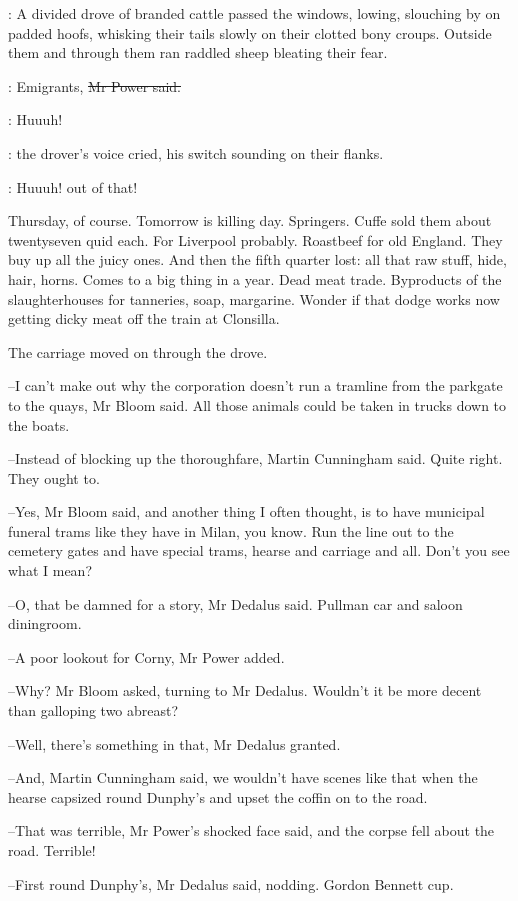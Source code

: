 :
A divided drove of branded cattle passed the windows,
lowing,
slouching by on padded hoofs,
whisking their tails slowly on their clotted bony croups.
Outside them and through them ran
raddled sheep bleating their fear.

\power:
Emigrants,
\sout{Mr Power said.}

\drover:
Huuuh!

:
the drover's voice cried,
his switch sounding on their flanks.

\drover:
Huuuh!
out of that!

Thursday, of course.
Tomorrow is killing day.
Springers.
Cuffe sold them about twentyseven quid each.
For Liverpool probably.
Roastbeef for old England.
They buy up all the juicy ones.
And then the fifth quarter lost:
all that raw stuff, hide, hair, horns.
Comes to a big thing in a year.
Dead meat trade.
Byproducts of the slaughterhouses for tanneries, soap, margarine.
Wonder if that dodge works now
getting dicky meat off the train at Clonsilla.

The carriage moved on through the drove.

--I can't make out why the corporation doesn't run a tramline
from the parkgate to the quays,
Mr Bloom said.
All those animals could be taken in trucks down to the boats.

--Instead of blocking up the thoroughfare,
Martin Cunningham said.
Quite right.
They ought to.

--Yes,
Mr Bloom said,
and another thing I often thought,
is to have municipal funeral trams like they have in Milan, you know.
Run the line out to the cemetery gates and have special trams,
hearse and carriage and all.
Don't you see what I mean?

--O, that be damned for a story,
Mr Dedalus said.
Pullman car and saloon diningroom.

--A poor lookout for Corny,
Mr Power added.

--Why?
Mr Bloom asked, turning to Mr Dedalus.
Wouldn't it be more decent than galloping two abreast?

--Well, there's something in that,
Mr Dedalus granted.

--And,
Martin Cunningham said,
we wouldn't have scenes like that
when the hearse capsized round Dunphy's
and upset the coffin on to the road.

--That was terrible,
Mr Power's shocked face said,
and the corpse fell about the road.
Terrible!

--First round Dunphy's,
Mr Dedalus said, nodding.
Gordon Bennett cup.

